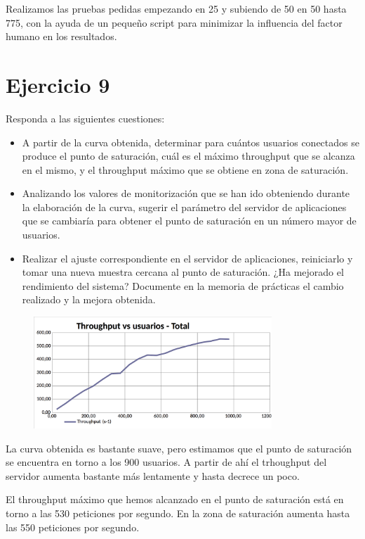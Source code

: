 \documentclass[a4paper, 10pt]{article}
\begin{document}
Realizamos las pruebas pedidas empezando en 25 y subiendo de 50 en 50 hasta 775, con la ayuda de un pequeño script para minimizar la influencia del factor humano en los resultados.

\section{Ejercicio 9}
\begin{mdframed} 
Responda a las siguientes cuestiones:
\begin{itemize}
	\item A partir de la curva obtenida, determinar para cuántos usuarios conectados se produce el punto de saturación, cuál es el máximo throughput que se alcanza en el mismo, y el throughput máximo que se obtiene en zona de saturación.
	\item Analizando los valores de monitorización que se han ido obteniendo durante la elaboración de la curva, sugerir el parámetro del servidor de aplicaciones que se cambiaría para obtener el punto de saturación en un número mayor de usuarios.
	\item Realizar el ajuste correspondiente en el servidor de aplicaciones, reiniciarlo y tomar una nueva muestra cercana al punto de saturación. ¿Ha mejorado el rendimiento del sistema? Documente en la memoria de prácticas el cambio realizado y la mejora obtenida.
\end{itemize}
\end{mdframed}

	\begin{figure}[hbtp]
	 	\centering
	 	\includegraphics[width=0.8\textwidth]{../../p2/pantallazos/ej9.png}
	\end{figure}

	La curva obtenida es bastante suave, pero estimamos que el punto de saturación se encuentra en torno a los 900 usuarios. A partir de ahí el trhoughput del servidor aumenta bastante más lentamente y hasta decrece un poco.

	El throughput máximo que hemos alcanzado en el punto de saturación está en torno a las 530 peticiones por segundo. En la zona de saturación aumenta hasta las 550 peticiones por segundo.
\end{document}
